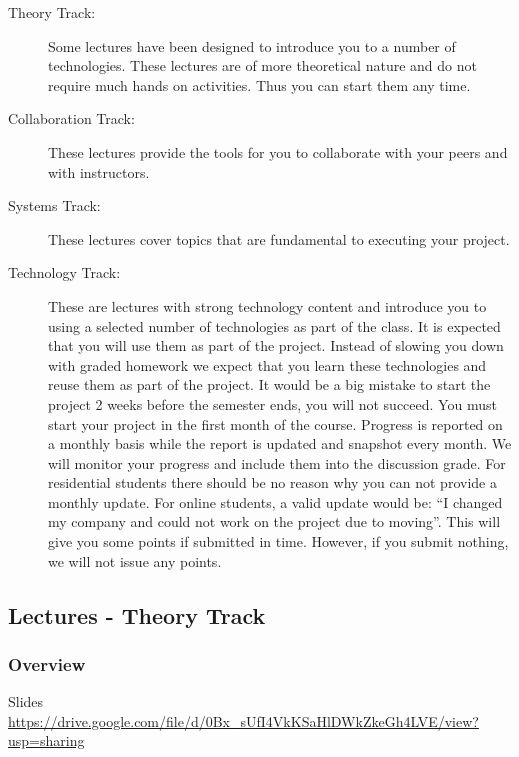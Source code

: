 \documentclass{article}
\begin{document}
\begin{description}

\item[Theory Track:]
Some lectures have been designed to introduce you to a number of
technologies. These lectures are of more theoretical nature and do not
require much hands on activities. Thus you can start them any time.

\item[Collaboration Track:]
These lectures provide the tools for you to collaborate with your peers
and with instructors.

\item[Systems Track:]
These lectures cover topics that are fundamental to executing your
project.

\item[Technology Track:]
These are lectures with strong technology content and introduce you to
using a selected number of technologies as part of the class. It is
expected that you will use them as part of the project. Instead of
slowing you down with graded homework we expect that you learn these
technologies and reuse them as part of the project. It would be a big
mistake to start the project 2 weeks before the semester ends, you will
not succeed. You must start your project in the first month of the
course. Progress is reported on a monthly basis while the report is
updated and snapshot every month. We will monitor your progress and
include them into the discussion grade. For residential students there
should be no reason why you can not provide a monthly update. For online
students, a valid update would be: ``I changed my company and could not
work on the project due to moving''. This will give you some points if
submitted in time. However, if you submit nothing, we will not issue any
points.

\end{description}

\subsection{Lectures - Theory Track}\label{lectures---theory-track}

\subsubsection{Overview}

Slides \url{https://drive.google.com/file/d/0Bx_sUfI4VkKSaHlDWkZkeGh4LVE/view?usp=sharing}
\end{document}
